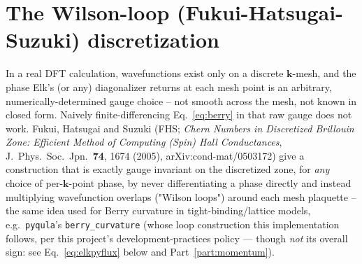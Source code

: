 \documentclass[11pt]{article}
\begin{document}
\section{The Wilson-loop (Fukui-Hatsugai-Suzuki) discretization}

In a real DFT calculation, wavefunctions exist only on a discrete $\mathbf k$-mesh, and
the phase Elk's (or any) diagonalizer returns at each mesh point is an arbitrary,
numerically-determined gauge choice -- not smooth across the mesh, not known in closed
form. Naively finite-differencing Eq.~\eqref{eq:berry} in that raw gauge does not work.
Fukui, Hatsugai and Suzuki (FHS; \emph{Chern Numbers in Discretized Brillouin Zone:
Efficient Method of Computing (Spin) Hall Conductances}, J.\ Phys.\ Soc.\ Jpn.\
\textbf{74}, 1674 (2005), arXiv:cond-mat/0503172) give a construction that is exactly
gauge invariant on the discretized zone, for {\it any} choice of per-$\mathbf k$-point
phase, by never differentiating a phase directly and instead multiplying wavefunction
overlaps ("Wilson loops") around each mesh plaquette -- the same idea used for Berry
curvature in tight-binding/lattice models, e.g.\ \texttt{pyqula}'s
\texttt{berry\_curvature} (whose loop construction this implementation follows, per this
project's development-practices policy --- though \emph{not} its overall sign: see
Eq.~\eqref{eq:elkpyflux} below and Part~\ref{part:momentum}).
\end{document}
